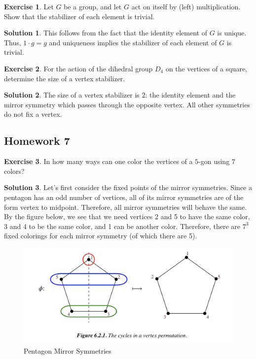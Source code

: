 \documentclass[12pt]{article}
\theoremstyle{definition}
\newtheorem{exercise}{\color{YellowOrange}Exercise}
\theoremstyle{definition}
\newtheorem{solution}{\color{Goldenrod}Solution}
\begin{document}
\begin{exercise}
Let $G$ be a group, and let $G$ act on itself by (left) multiplication. Show that the stabilizer of each element is trivial.
\end{exercise}
\begin{solution}
This follows from the fact that the identity element of $G$ is unique. Thus, $1 \cdot g = g$ and uniqueness implies the stabilizer of each element of $G$ is trivial. 
\end{solution}

\begin{exercise}
For the action of the dihedral group $D_4$ on the vertices of a square, determine the size of a vertex stabilizer. 
\end{exercise}
\begin{solution}
The size of a vertex stabilizer is $2$: the identity element and the mirror symmetry which passes through the opposite vertex. All other symmetries do not fix a vertex. 
\end{solution}

\subsection{Homework 7}
\begin{exercise}
In how many ways can one color the vertices of a $5$-gon using $7$ colors?
\end{exercise}
\begin{solution}
Let's first consider the fixed points of the mirror symmetries. Since a pentagon has an odd number of vertices, all of its mirror symmetries are of the form vertex to midpoint. Therefore, all mirror symmetries will behave the same. By the figure below, we see that we need vertices 2 and 5 to have the same color, 3 and 4 to be the same color, and 1 can be another color. Therefore, there are $7^3$ fixed colorings for each mirror symmetry (of which there are 5). 
\begin{figure}[H]
	\begin{center}
		\includegraphics[scale=.6]{pentagon_permutation}
	\end{center}
	\caption{Pentagon Mirror Symmetries}
\end{figure}
\end{solution}
\end{document}
